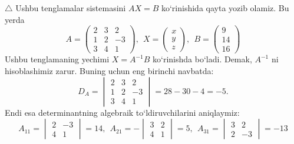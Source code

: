 \begin{enumerate}
$\triangle$ Ushbu tenglamalar sistemasini $AX=B$ ko`rinishida qayta yozib olamiz. Bu yerda
$$A=\begin{pmatrix}
	2&3&2\\
	1&2&-3\\
	3&4&1
\end{pmatrix},\ \ X=\begin{pmatrix}
x\\y\\
z
\end{pmatrix},\ \ B=\begin{pmatrix}
9\\14\\16
\end{pmatrix}$$
Ushbu  tenglamaning yechimi $X=A^{-1}B$ ko`rinishda bo`ladi. Demak, $A^{-1}$ ni hisoblashimiz zarur. Buning uchun eng birinchi navbatda:
$$D_A=\begin{vmatrix}
		2&3&2\\
	1&2&-3\\
	3&4&1
\end{vmatrix}=28-30-4=-5.$$
Endi esa determinantning algebraik to`ldiruvchilarini aniqlaymiz:
$$A_{11}=\begin{vmatrix}
	2&-3\\4&1
\end{vmatrix}=14,\ \ A_{21}=-\begin{vmatrix}
3&2\\4&1
\end{vmatrix}=5,\ \ A_{31}=\begin{vmatrix}
3&2\\2&-3
\end{vmatrix}=-13$$


\end{enumerate}
